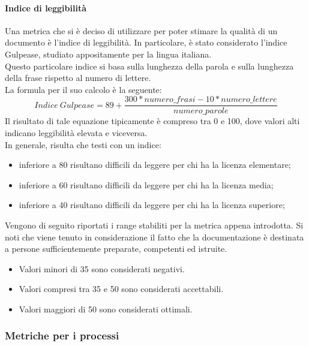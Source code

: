 				\paragraph{Indice di leggibilità}
					Una metrica che si è deciso di utilizzare per poter stimare la qualità di un documento è l'indice di leggibilità. In particolare, è 
					stato considerato l'indice Gulpease, studiato appositamente per la lingua italiana.\\
					Questo particolare indice si basa sulla lunghezza della parola e sulla lunghezza della frase rispetto al numero di lettere.\\
					La formula per il suo calcolo è la seguente:
					\begin{equation}
						\label{Indice Gulpease}
						Indice\ Gulpease = 89 + \frac{300*numero\_frasi-10*numero\_lettere}{numero\_parole}
					\end{equation}
					Il risultato di tale equazione tipicamente è compreso tra 0 e 100, dove valori alti indicano leggibilità elevata e viceversa.\\
					In generale, risulta che testi con un indice:
					\begin{itemize}
						\item inferiore a 80 risultano difficili da leggere per chi ha la licenza elementare;
						\item inferiore a 60 risultano difficili da leggere per chi ha la licenza media;
						\item inferiore a 40 risultano difficili da leggere per chi ha la licenza superiore;
					\end{itemize}
					Vengono di seguito riportati i range stabiliti per la metrica appena introdotta. Si noti che viene tenuto in considerazione il fatto 
					che la documentazione è destinata a persone sufficientemente preparate, competenti ed istruite.
					\begin{itemize}
						\item Valori minori di 35 sono considerati negativi.
						\item Valori compresi tra 35 e 50 sono considerati accettabili.
						\item Valori maggiori di 50 sono considerati ottimali.
					\end{itemize}
			\subsubsection{Metriche per i processi}
